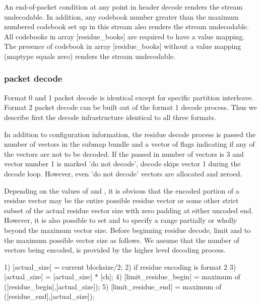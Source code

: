 An end-of-packet condition at any point in header decode renders the
stream undecodable.  In addition, any codebook number greater than the
maximum numbered codebook set up in this stream also renders the
stream undecodable. All codebooks in array [residue\_books] are
required to have a value mapping.  The presence of codebook in array
[residue\_books] without a value mapping (maptype equals zero) renders
the stream undecodable.



\subsubsection{packet decode}

Format 0 and 1 packet decode is identical except for specific
partition interleave.  Format 2 packet decode can be built out of the
format 1 decode process.  Thus we describe first the decode
infrastructure identical to all three formats.

In addition to configuration information, the residue decode process
is passed the number of vectors in the submap bundle and a vector of
flags indicating if any of the vectors are not to be decoded.  If the
passed in number of vectors is 3 and vector number 1 is marked 'do not
decode', decode skips vector 1 during the decode loop.  However, even
'do not decode' vectors are allocated and zeroed.

Depending on the values of  and
, it is obvious that the encoded
portion of a residue vector may be the entire possible residue vector
or some other strict subset of the actual residue vector size with
zero padding at either uncoded end.  However, it is also possible to
set  and
 to specify a range partially or
wholly beyond the maximum vector size.  Before beginning residue
decode, limit  and
 to the maximum possible vector size
as follows.  We assume that the number of vectors being encoded,
\varname{[ch]} is provided by the higher level decoding
process.

\begin{programlisting}
  1) [actual\_size] = current blocksize/2;
  2) if residue encoding is format 2
       3) [actual\_size] = [actual\_size] * [ch];
  4) [limit\_residue\_begin] = maximum of ([residue\_begin],[actual\_size]);
  5) [limit\_residue\_end] = maximum of ([residue\_end],[actual\_size]);
\end{programlisting}

